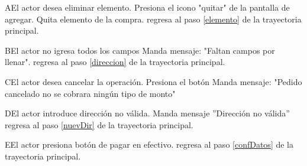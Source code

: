 \begin{UCtrayectoriaA}{A}{El actor desea eliminar elemento.}
	\UCpaso [\UCactor] Presiona el icono "quitar" de la pantalla de agregar.
	\UCpaso [\UCsist] Quita elemento de la compra.
	\UCpaso regresa al paso \ref{elemento} de la trayectoria principal.
\end{UCtrayectoriaA} 
\begin{UCtrayectoriaA}{B}{El actor no igresa todos los campos}
	\UCpaso [\UCsist] Manda mensaje: "Faltan campos por llenar".
	\UCpaso regresa al paso \ref{direccion} de la trayectoria principal.
\end{UCtrayectoriaA} 

\begin{UCtrayectoriaA}{C}{El actor desea cancelar la operación.}
	\UCpaso [\UCactor] Presiona el botón 
	\UCpaso [\UCsist] Manda mensaje: "Pedido cancelado no se cobrara ningún tipo de monto"
\end{UCtrayectoriaA}

\begin{UCtrayectoriaA}{D}{El actor introduce dirección no válida.}
	\UCpaso [\UCsist] Manda mensaje ''Dirección no válida'' 
	\UCpaso regresa al paso \ref{nuevDir} de la trayectoria principal.
\end{UCtrayectoriaA}

\begin{UCtrayectoriaA}{E}{El actor presiona botón de pagar en efectivo.} 
	\UCpaso regresa al paso \ref{confDatos} de la trayectoria principal.
\end{UCtrayectoriaA}


